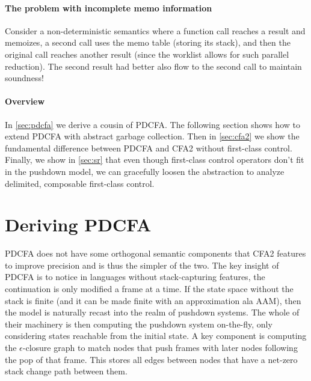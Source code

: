 \paragraph{The problem with incomplete memo information}
Consider a non-deterministic semantics where a function call reaches a result and memoizes, a second call uses the memo table (storing its stack), and then the original call reaches another result (since the worklist allows for such parallel reduction).
%
The second result had better also flow to the second call to maintain soundness!

\paragraph{Overview}
In \autoref{sec:pdcfa} we derive a cousin of PDCFA.
%
The following section shows how to extend PDCFA with abstract garbage collection. %
%
Then in \autoref{sec:cfa2} we show the fundamental difference between PDCFA and CFA2 without first-class control. %
%
%
Finally, we show in \autoref{sec:sr} that even though first-class control operators don't fit in the pushdown model, we can gracefully loosen the abstraction to analyze delimited, composable first-class control.

\section{Deriving PDCFA}
\label{sec:pdcfa}

PDCFA does not have some orthogonal semantic components that CFA2 features to improve precision and is thus the simpler of the two.
%
The key insight of PDCFA is to notice in languages without stack-capturing features, the continuation is only modified a frame at a time.
%
If the state space without the stack is finite (and it can be made finite with an approximation ala AAM), then the model is naturally recast into the realm of pushdown systems.
%
The whole of their machinery is then computing the pushdown system on-the-fly, only considering states reachable from the initial state.
%
A key component is computing the $\epsilon$-closure graph to match nodes that push frames with later nodes following the pop of that frame.
%
This stores all edges between nodes that have a net-zero stack change path between them.
%

